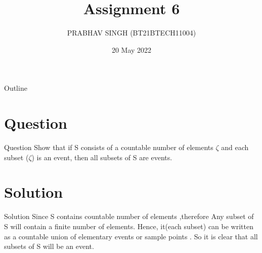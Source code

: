 \documentclass{beamer}
\title{Assignment 6}
\author{PRABHAV SINGH (BT21BTECH11004)}
\date{20 May 2022}
\begin{document}
	
	\begin{frame}
		\titlepage 
	\end{frame}
	
	\logo{}
	
	
	\begin{frame}{Outline}
		\tableofcontents
	\end{frame}
	
	\section{Question}
	\begin{frame}{Question}
	Show that if S consists of a countable number of elements $ \zeta  $ and each subset ($ \zeta $) is an event, 
	then all subsets of S are events.
		
	\end{frame}
	
	
	\section{Solution}
	\begin{frame}{Solution}
		Since S contains countable number of elements ,therefore Any subset of S will contain a finite number of elements. Hence, it(each subset) 
		can be written as a countable union of elementary events or sample points . So it is clear that all subsets of S will be an event.
\end{frame} 
\end{document}
